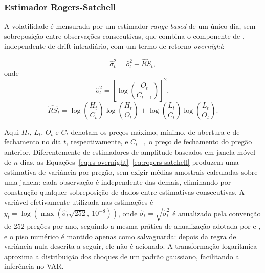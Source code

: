\documentclass[12pt, a4paper, oneside, english, brazil]{abntex2}
\begin{document}
\subsubsection*{Estimador Rogers-Satchell}

A volatilidade é mensurada por um estimador \textit{range-based} de um único dia, 
sem sobreposição entre observações consecutivas, que combina o componente
de \textcite{rogers1991}, independente de drift intradiário, com um termo de retorno \textit{overnight}:

\begin{equation}
    \hat{\sigma}^2_t = \hat{o}^2_t + \widehat{RS}_t,
    \label{eq:rs-overnight}
\end{equation}
onde
\begin{equation}
    \hat{o}^2_t = \left[\log\!\left(\frac{O_t}{C_{t-1}}\right)\right]^2,
    \label{eq:overnight}
\end{equation}
\begin{equation}
    \widehat{RS}_t = \log\!\left(\frac{H_t}{C_t}\right)\log\!\left(\frac{H_t}{O_t}\right)
    + \log\!\left(\frac{L_t}{C_t}\right)\log\!\left(\frac{L_t}{O_t}\right).
    \label{eq:rogers-satchell}
\end{equation}

\noindent Aqui $H_t$, $L_t$, $O_t$ e $C_t$ denotam os preços máximo, mínimo, de abertura
e de fechamento no dia $t$, respectivamente, e $C_{t-1}$ o preço de fechamento do pregão anterior. Diferentemente de estimadores de amplitude baseados em
janela móvel de $n$ dias, as Equações~\ref{eq:rs-overnight}--\ref{eq:rogers-satchell}
produzem uma estimativa de variância por pregão, sem exigir médias amostrais
calculadas sobre uma janela: cada observação é independente das demais,
eliminando por construção qualquer sobreposição de dados entre estimativas
consecutivas. A variável efetivamente utilizada nas estimações é
$y_t = \log\!\left(\max\!\left(\hat{\sigma}_t \sqrt{252},\ 10^{-8}\right)\right)$,
onde $\hat{\sigma}_t = \sqrt{\hat{\sigma}^2_t}$ é anualizado pela convenção de
252 pregões por ano, seguindo a mesma prática de anualização adotada por
\textcite{diebold2012} e \textcite{diebold2014}, e o piso numérico é mantido apenas como
salvaguarda: depois da regra de variância nula descrita a seguir, ele não é acionado. A
transformação logarítmica aproxima a distribuição dos choques de um padrão
gaussiano, facilitando a inferência no VAR.
\end{document}
